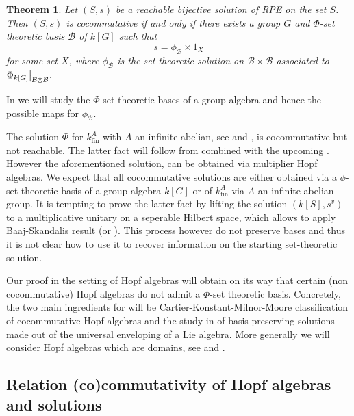\documentclass[a4paper,10pt]{amsart}
\newtheorem{theorem}[lemma]{Theorem}
\theoremstyle{definition}
\theoremstyle{remark}
\newcommand{\fin}{\operatorname{fin}}
\newcommand\ot{\otimes}
\newcommand\mc{\mathcal}
\newcommand\restr[2]{{%
   \left.\kern-\nulldelimiterspace %
   #1 %
   \right|_{#2} %
   }}
\begin{document}
\begin{theorem}\label{classif cocomm sol}
Let $(S,s)$ be a reachable bijective solution of RPE on the set $S$. Then $(S,s)$ is cocommutative if and only if there exists a group $G$ and $\Phi$-set theoretic basis $\mc{B}$ of $k[G]$ such that 
$$ s = \phi_{\mc{B}} \times 1_{X}$$ 
for some set $X$, where $\phi_{\mc{B}}$ is the set-theoretic solution on $\mc{B} \times \mc{B}$ associated to $\restr{\Phi_{k[G]}}{\mc{B} \ot \mc{B}}$.
\end{theorem}

In  we will study the $\Phi$-set theoretic bases of a group algebra and hence the possible maps for $\phi_{\mc{B}}$. 

The solution $\Phi$ for $k_{\fin}^{A}$ with $A$ an infinite abelian, see  and , is cocommutative but not reachable. The latter fact will follow from  combined with the upcoming . However the aforementioned solution, can be obtained via multiplier Hopf algebras. We expect that all cocommutative solutions are either obtained via a $\phi$-set theoretic basis of a group algebra $k[G]$ or of $k_{\fin}^{A}$ via $A$ an infinite abelian group. It is tempting to prove the latter fact by lifting the solution $(k[S],s^v)$ to a multiplicative unitary on a seperable Hilbert space, which allows to apply Baaj-Skandalis result \cite[Theorem 0.1]{BaSk03} (or \cite[Theorem 2.1]{BaSk93}). This process however do not preserve bases and thus it is not clear how to use it to recover information on the starting set-theoretic solution.\smallskip



Our proof in the setting of Hopf algebras will obtain on its way that certain (non cocommutative) Hopf algebras do not admit a $\Phi$-set theoretic basis. Concretely, the two main ingredients for  will be Cartier-Konstant-Milnor-Moore classification of cocommutative Hopf algebras and the study in  of basis preserving solutions made out of the universal enveloping of a Lie algebra. More generally we will consider Hopf algebras which are domains, see  and . 






\subsection{Relation (co)commutativity of Hopf algebras and solutions}\label{cocomm from sol to hopf}
\end{document}
